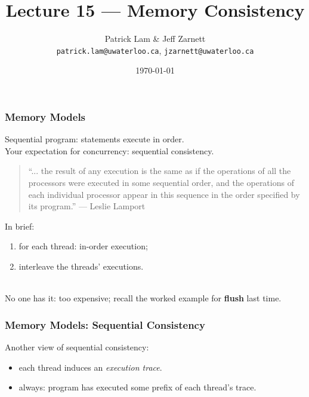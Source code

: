 

\title{Lecture 15 --- Memory Consistency}

\author{Patrick Lam \& Jeff Zarnett\\ \small \texttt{patrick.lam@uwaterloo.ca}, \texttt{jzarnett@uwaterloo.ca}}
\date{\today}




\begin{frame}
  \titlepage

 \end{frame}
\begin{frame}
  \frametitle{Memory Models}

  

  Sequential program: statements execute in order.\\

  Your expectation for concurrency: sequential consistency.

\begin{quote}
``... the result of any execution is the same as if the operations of all the processors were executed in some sequential order, and the operations of each individual processor appear in this sequence in the order specified by its program.'' --- Leslie Lamport
\end{quote}
  In brief:
  \begin{enumerate}
  \item for each thread: in-order execution;
  \item interleave the threads' executions.
  \end{enumerate}~\\

  No one has it: too expensive; recall the worked example for {\bf flush} last time.

\end{frame}



\begin{frame}
  \frametitle{Memory Models: Sequential Consistency}

  
    Another view of sequential consistency:

    \begin{itemize}
      \item each thread induces an \emph{execution trace}.
      \item always: program has executed some prefix of each thread's
        trace.
    \end{itemize}
  
\end{frame}

